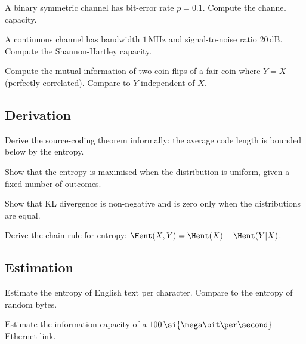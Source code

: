 \begin{exercise}
A binary symmetric channel has bit-error rate $p = 0.1$. Compute the channel capacity.
\end{exercise}

\begin{exercise}
A continuous channel has bandwidth $1\,\si{\mega\hertz}$ and signal-to-noise ratio $20\,\si{\dB}$. Compute the Shannon-Hartley capacity.
\end{exercise}

\begin{exercise}
Compute the mutual information of two coin flips of a fair coin where $Y = X$ (perfectly correlated). Compare to $Y$ independent of $X$.
\end{exercise}

\subsection*{Derivation}

\begin{exercise}
Derive the source-coding theorem informally: the average code length is bounded below by the entropy.
\end{exercise}

\begin{exercise}
Show that the entropy is maximised when the distribution is uniform, given a fixed number of outcomes.
\end{exercise}

\begin{exercise}
Show that KL divergence is non-negative and is zero only when the distributions are equal.
\end{exercise}

\begin{exercise}
Derive the chain rule for entropy: $\Hent(X, Y) = \Hent(X) + \Hent(Y|X)$.
\end{exercise}

\subsection*{Estimation}

\begin{exercise}
Estimate the entropy of English text per character. Compare to the entropy of random bytes.
\end{exercise}

\begin{exercise}
Estimate the information capacity of a $100\,\si{\mega\bit\per\second}$ Ethernet link.
\end{exercise}

